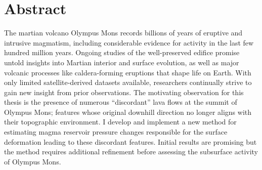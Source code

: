 \chapter{Abstract}
The martian volcano Olympus Mons records billions of years of eruptive and intrusive magmatism, including considerable evidence for activity in the last few hundred million years. Ongoing studies of the well-preserved edifice promise untold insights into Martian interior and surface evolution, as well as major volcanic processes like caldera-forming eruptions that shape life on Earth. With only limited satellite-derived datasets available, researchers continually strive to gain new insight from prior observations. The motivating observation for this thesis is the presence of numerous ``discordant'' lava flows at the summit of Olympus Mons; features whose original downhill direction no longer aligns with their topographic environment. I develop and implement a new method for estimating magma reservoir pressure changes responsible for the surface deformation leading to these discordant features. Initial results are promising but the method requires additional refinement before assessing the subsurface activity of Olympus Mons.